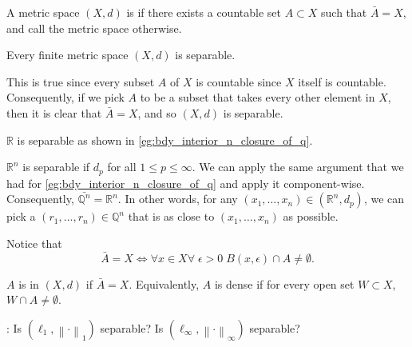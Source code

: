 \documentclass[notoc,notitlepage]{tufte-book}
\newcommand{\norm}[1]{\left\| #1 \right\|}
\begin{document}
\begin{defn}[Separable]\label{defn:separable}
  A metric space $(X, d)$ is  if there exists a countable set $A \subset X$ such that $\bar{A} = X$, and call the metric space  otherwise.
\end{defn}

\begin{eg}
  Every finite metric space $(X, d)$ is separable.

  This is true since every subset $A$ of $X$ is countable since $X$ itself is countable. Consequently, if we pick $A$ to be a subset that takes every other element in $X$, then it is clear that $\bar{A} = X$, and so $(X, d)$ is separable.
\end{eg}

\begin{eg}
  $\mathbb{R}$ is separable as shown in \cref{eg:bdy_interior_n_closure_of_q}.
\end{eg}

\begin{eg}
  $\mathbb{R}^n$ is separable if $d_p$ for all $1 \leq p \leq \infty$. We can apply the same argument that we had for \cref{eg:bdy_interior_n_closure_of_q} and apply it component-wise. Consequently, $\bar{\mathbb{Q}^n} = \mathbb{R}^n$. In other words, for any $(x_1, \ldots, x_n) \in (\mathbb{R}^n, d_p)$, we can pick a $(r_1, \ldots, r_n) \in \mathbb{Q}^n$ that is as close to $(x_1, \ldots, x_n)$ as possible.
\end{eg}

\begin{remark}
  Notice that
  \begin{equation*}
    \bar{A} = X \iff \forall x \in X \forall \; \epsilon > 0 \; B(x, \epsilon) \cap A \neq \emptyset.
  \end{equation*}
\end{remark}

\begin{defn}[Dense]\label{defn:dense}
  $A$ is  in $(X, d)$ if $\bar{A} = X$. Equivalently, $A$ is dense if for every open set $W \subset X$, $W \cap A \neq \emptyset$.
\end{defn}

: Is $(\ell_1, \norm\cdot_1)$ separable? Is $(\ell_\infty, \norm\cdot_\infty)$ separable?
\end{document}
